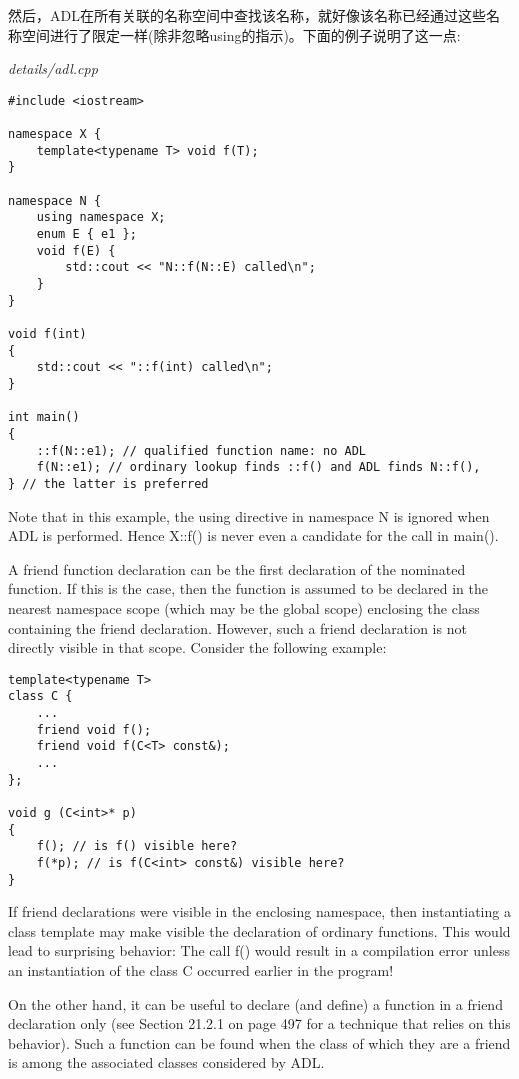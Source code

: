 然后，ADL在所有关联的名称空间中查找该名称，就好像该名称已经通过这些名称空间进行了限定一样(除非忽略using的指示)。下面的例子说明了这一点:

\noindent
\textit{details/adl.cpp}
\begin{lstlisting}[style=styleCXX]
#include <iostream>

namespace X {
	template<typename T> void f(T);
}

namespace N {
	using namespace X;
	enum E { e1 };
	void f(E) {
		std::cout << "N::f(N::E) called\n";
	}
}

void f(int)
{
	std::cout << "::f(int) called\n";
}

int main()
{
	::f(N::e1); // qualified function name: no ADL
	f(N::e1); // ordinary lookup finds ::f() and ADL finds N::f(),
} // the latter is preferred
\end{lstlisting}

Note that in this example, the using directive in namespace N is ignored when ADL is performed. Hence X::f() is never even a candidate for the call in main().


A friend function declaration can be the first declaration of the nominated function. If this is the case, then the function is assumed to be declared in the nearest namespace scope (which may be the global scope) enclosing the class containing the friend declaration. However, such a friend declaration is not directly visible in that scope. Consider the following example:

\begin{lstlisting}[style=styleCXX]
template<typename T>
class C {
	...
	friend void f();
	friend void f(C<T> const&);
	...
};

void g (C<int>* p)
{
	f(); // is f() visible here?
	f(*p); // is f(C<int> const&) visible here?
}
\end{lstlisting}

If friend declarations were visible in the enclosing namespace, then instantiating a class template may make visible the declaration of ordinary functions. This would lead to surprising behavior: The call f() would result in a compilation error unless an instantiation of the class C occurred earlier in the program!

On the other hand, it can be useful to declare (and define) a function in a friend declaration only (see Section 21.2.1 on page 497 for a technique that relies on this behavior). Such a function can be found when the class of which they are a friend is among the associated classes considered by ADL.


